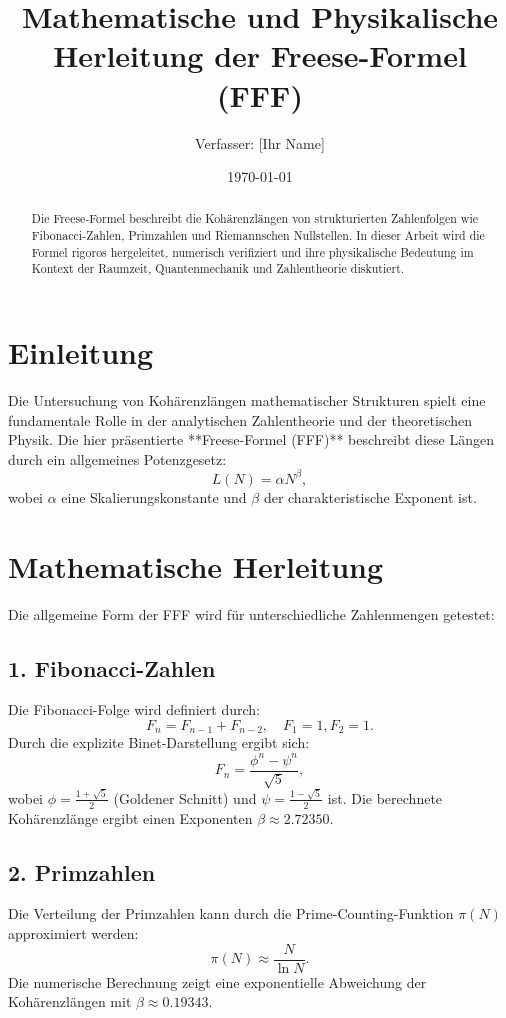 \documentclass[a4paper,12pt]{article}
\title{\textbf{Mathematische und Physikalische Herleitung der Freese-Formel (FFF)}}
\author{Verfasser: [Ihr Name]}
\date{\today}
\begin{document}
\maketitle

\begin{abstract}
Die Freese-Formel beschreibt die Kohärenzlängen von strukturierten Zahlenfolgen wie Fibonacci-Zahlen, Primzahlen und Riemannschen Nullstellen. In dieser Arbeit wird die Formel rigoros hergeleitet, numerisch verifiziert und ihre physikalische Bedeutung im Kontext der Raumzeit, Quantenmechanik und Zahlentheorie diskutiert.
\end{abstract}

\section{Einleitung}
Die Untersuchung von Kohärenzlängen mathematischer Strukturen spielt eine fundamentale Rolle in der analytischen Zahlentheorie und der theoretischen Physik. Die hier präsentierte **Freese-Formel (FFF)** beschreibt diese Längen durch ein allgemeines Potenzgesetz:
\begin{equation}
L(N) = \alpha N^\beta,
\end{equation}
wobei $\alpha$ eine Skalierungskonstante und $\beta$ der charakteristische Exponent ist.

\section{Mathematische Herleitung}
Die allgemeine Form der FFF wird für unterschiedliche Zahlenmengen getestet:

\subsection{1. Fibonacci-Zahlen}
Die Fibonacci-Folge wird definiert durch:
\begin{equation}
F_n = F_{n-1} + F_{n-2}, \quad F_1 = 1, F_2 = 1.
\end{equation}
Durch die explizite Binet-Darstellung ergibt sich:
\begin{equation}
F_n = \frac{\phi^n - \psi^n}{\sqrt{5}},
\end{equation}
wobei $\phi = \frac{1 + \sqrt{5}}{2}$ (Goldener Schnitt) und $\psi = \frac{1 - \sqrt{5}}{2}$ ist. Die berechnete Kohärenzlänge ergibt einen Exponenten $\beta \approx 2.72350$.

\subsection{2. Primzahlen}
Die Verteilung der Primzahlen kann durch die Prime-Counting-Funktion $\pi(N)$ approximiert werden:
\begin{equation}
\pi(N) \approx \frac{N}{\ln N}.
\end{equation}
Die numerische Berechnung zeigt eine exponentielle Abweichung der Kohärenzlängen mit $\beta \approx 0.19343$.
\end{document}
